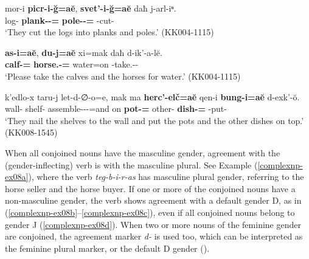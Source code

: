 \begin{exe}
	\ex\label{complexnp-ex07}
	\begin{xlist}
		
		\ex\label{complexnp-ex07a}
		\gll mor-i \textbf{picr-i-\u{g}=a\u{e}}, \textbf{svet'-i-\u{g}=a\u{e}} daħ j-arl-iⁿ. \\
		log-{\Pl} \textbf{plank-{\Pl}-{\Trans}={\Add}} \textbf{pole-{\Pl}-{\Trans}={\Add}} {\Pv} {\J}-cut-{\Aor} \\
		\trans `They cut the logs into planks and poles.'
		\hfill (KK004-1115)
		
		\ex\label{complexp-ex07b}
		\gll \textbf{as-i=a\u{e}}, \textbf{du-j=a\u{e}} xi=mak daħ d-ik'-a-l\u{e}. \\
		\textbf{calf-{\Pl}={\Add}} \textbf{horse.{\Obl}-{\Pl}={\Add}} water=on {\Pv} {\D}-take.{\Anim}-{\Imp}-{\Hort} \\
		\trans `Please take the calves and the horses for water.'
		\hfill (KK004-1115)
		
		\ex\label{complexnp-ex07c}
		\gll k'edlo-x taru-j let-d-∅-o=e, mak ma \textbf{herc'-elč=a\u{e}} qen-i \textbf{bung-i=a\u{e}} d-exk'-\u{o}. \\
		wall-{\Cont} shelf-{\Pl} assemble-{\D}-{\Tr}-{\Npst}=and on {\Contr} \textbf{pot-{\Pl}={\Add}} other-{\Pl} \textbf{dish-{\Pl}={\Add}} {\D}-put-{\Npst} \\
		\trans `They nail the shelves to the wall and put the pots and the other dishes on top.'
		\hfill (KK008-1545)
		
	\end{xlist}
\end{exe}

When all conjoined nouns have the masculine gender, agreement with the (gender-inflecting) verb is with the masculine plural. See Example (\ref{complexnp-ex08a}), where the verb \textit{teg-b-i-r-as} has masculine plural gender, referring to the horse seller and the horse buyer. If one or more of the conjoined nouns have a non-masculine gender, the verb shows agreement with a default gender D, as in (\ref{complexnp-ex08b}--\ref{complexnp-ex08c}), even if all conjoined nouns belong to gender J (\ref{complexnp-ex08d}). When two or more nouns of the feminine gender are conjoined, the agreement marker \textit{d-} is used too, which can be interpreted as the feminine plural marker, or the default D gender (\cite[191]{holiskygagua}).

